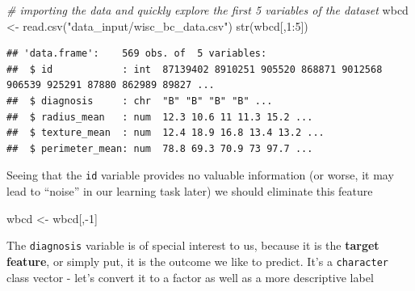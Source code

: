\documentclass[
]{article}
\newenvironment{Shaded}{\begin{snugshade}}{\end{snugshade}}
\newcommand{\AttributeTok}[1]{\textcolor[rgb]{0.77,0.63,0.00}{#1}}
\newcommand{\CommentTok}[1]{\textcolor[rgb]{0.56,0.35,0.01}{\textit{#1}}}
\newcommand{\DecValTok}[1]{\textcolor[rgb]{0.00,0.00,0.81}{#1}}
\newcommand{\FunctionTok}[1]{\textcolor[rgb]{0.00,0.00,0.00}{#1}}
\newcommand{\NormalTok}[1]{#1}
\newcommand{\OtherTok}[1]{\textcolor[rgb]{0.56,0.35,0.01}{#1}}
\newcommand{\SpecialCharTok}[1]{\textcolor[rgb]{0.00,0.00,0.00}{#1}}
\newcommand{\StringTok}[1]{\textcolor[rgb]{0.31,0.60,0.02}{#1}}
\begin{document}
\begin{Shaded}
\begin{Highlighting}[]
\CommentTok{\# importing the data and quickly explore the first 5 variables of the dataset}
\NormalTok{wbcd }\OtherTok{\textless{}{-}} \FunctionTok{read.csv}\NormalTok{(}\StringTok{"data\_input/wisc\_bc\_data.csv"}\NormalTok{)}
\FunctionTok{str}\NormalTok{(wbcd[,}\DecValTok{1}\SpecialCharTok{:}\DecValTok{5}\NormalTok{])}
\end{Highlighting}
\end{Shaded}

\begin{verbatim}
## 'data.frame':    569 obs. of  5 variables:
##  $ id            : int  87139402 8910251 905520 868871 9012568 906539 925291 87880 862989 89827 ...
##  $ diagnosis     : chr  "B" "B" "B" "B" ...
##  $ radius_mean   : num  12.3 10.6 11 11.3 15.2 ...
##  $ texture_mean  : num  12.4 18.9 16.8 13.4 13.2 ...
##  $ perimeter_mean: num  78.8 69.3 70.9 73 97.7 ...
\end{verbatim}

Seeing that the \texttt{id} variable provides no valuable information
(or worse, it may lead to ``noise'' in our learning task later) we
should eliminate this feature

\begin{Shaded}
\begin{Highlighting}[]
\NormalTok{wbcd }\OtherTok{\textless{}{-}}\NormalTok{ wbcd[,}\SpecialCharTok{{-}}\DecValTok{1}\NormalTok{]}
\end{Highlighting}
\end{Shaded}

The \texttt{diagnosis} variable is of special interest to us, because it
is the \textbf{target feature}, or simply put, it is the outcome we like
to predict. It's a \texttt{character} class vector - let's convert it to
a factor as well as a more descriptive label

\begin{Shaded}
\end{Shaded}
\end{document}
